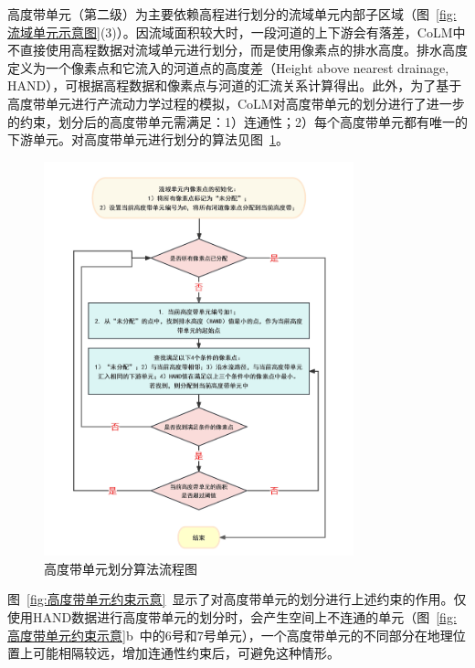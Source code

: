 高度带单元（第二级）为主要依赖高程进行划分的流域单元内部子区域（图~\ref{fig:流域单元示意图}(3)）。因流域面积较大时，一段河道的上下游会有落差，CoLM中不直接使用高程数据对流域单元进行划分，而是使用像素点的排水高度。排水高度定义为一个像素点和它流入的河道点的高度差（Height above nearest drainage, HAND），可根据高程数据和像素点与河道的汇流关系计算得出。此外，为了基于高度带单元进行产流动力学过程的模拟，CoLM对高度带单元的划分进行了进一步的约束，划分后的高度带单元需满足：1）连通性；2）每个高度带单元都有唯一的下游单元。对高度带单元进行划分的算法见图~\ref{fig:高度带单元算法流程}。

{
  \begin{figure}[htbp]
    \centering
    \includegraphics[width=0.8\textwidth]{Figures/模式构架/高度带单元划分算法.jpg}
    \caption{高度带单元划分算法流程图}
    \label{fig:高度带单元算法流程}
  \end{figure}
}

图~\ref{fig:高度带单元约束示意}~显示了对高度带单元的划分进行上述约束的作用。仅使用HAND数据进行高度带单元的划分时，会产生空间上不连通的单元（图~\ref{fig:高度带单元约束示意}b~中的6号和7号单元），一个高度带单元的不同部分在地理位置上可能相隔较远，增加连通性约束后，可避免这种情形。

